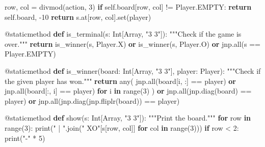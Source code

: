 \documentclass[
  letterpaper,
  DIV=11,
  numbers=noendperiod]{scrreprt}
\newenvironment{Shaded}{\begin{snugshade}}{\end{snugshade}}
\newcommand{\AttributeTok}[1]{\textcolor[rgb]{0.40,0.45,0.13}{#1}}
\newcommand{\BuiltInTok}[1]{\textcolor[rgb]{0.00,0.23,0.31}{#1}}
\newcommand{\CommentTok}[1]{\textcolor[rgb]{0.37,0.37,0.37}{#1}}
\newcommand{\ControlFlowTok}[1]{\textcolor[rgb]{0.00,0.23,0.31}{\textbf{#1}}}
\newcommand{\DecValTok}[1]{\textcolor[rgb]{0.68,0.00,0.00}{#1}}
\newcommand{\KeywordTok}[1]{\textcolor[rgb]{0.00,0.23,0.31}{\textbf{#1}}}
\newcommand{\NormalTok}[1]{\textcolor[rgb]{0.00,0.23,0.31}{#1}}
\newcommand{\OperatorTok}[1]{\textcolor[rgb]{0.37,0.37,0.37}{#1}}
\newcommand{\StringTok}[1]{\textcolor[rgb]{0.13,0.47,0.30}{#1}}
\newcommand{\VariableTok}[1]{\textcolor[rgb]{0.07,0.07,0.07}{#1}}
\theoremstyle{plain}
\theoremstyle{plain}
\theoremstyle{definition}
\theoremstyle{definition}
\theoremstyle{remark}
\begin{document}
\begin{Shaded}
\begin{Highlighting}[]
\NormalTok{            row, col }\OperatorTok{=} \BuiltInTok{divmod}\NormalTok{(action, }\DecValTok{3}\NormalTok{)}
            \ControlFlowTok{if} \VariableTok{self}\NormalTok{.board[row, col] }\OperatorTok{!=}\NormalTok{ Player.EMPTY:}
                \ControlFlowTok{return} \VariableTok{self}\NormalTok{.board, }\OperatorTok{{-}}\DecValTok{10}
            \ControlFlowTok{return}\NormalTok{ s.at[row, col].}\BuiltInTok{set}\NormalTok{(player)}

        \AttributeTok{@staticmethod}
        \KeywordTok{def}\NormalTok{ is\_terminal(s: Int[Array, }\StringTok{"3 3"}\NormalTok{]):}
            \CommentTok{"""Check if the game is over."""}
            \ControlFlowTok{return}\NormalTok{ is\_winner(s, Player.X) }\KeywordTok{or}\NormalTok{ is\_winner(s, Player.O) }\KeywordTok{or}\NormalTok{ jnp.}\BuiltInTok{all}\NormalTok{(s }\OperatorTok{==}\NormalTok{ Player.EMPTY)}

        \AttributeTok{@staticmethod}
        \KeywordTok{def}\NormalTok{ is\_winner(board: Int[Array, }\StringTok{"3 3"}\NormalTok{], player: Player):}
            \CommentTok{"""Check if the given player has won."""}
            \ControlFlowTok{return} \BuiltInTok{any}\NormalTok{(}
\NormalTok{                jnp.}\BuiltInTok{all}\NormalTok{(board[i, :] }\OperatorTok{==}\NormalTok{ player) }\KeywordTok{or}
\NormalTok{                jnp.}\BuiltInTok{all}\NormalTok{(board[:, i] }\OperatorTok{==}\NormalTok{ player)}
                \ControlFlowTok{for}\NormalTok{ i }\KeywordTok{in} \BuiltInTok{range}\NormalTok{(}\DecValTok{3}\NormalTok{)}
\NormalTok{            ) }\KeywordTok{or}\NormalTok{ jnp.}\BuiltInTok{all}\NormalTok{(jnp.diag(board) }\OperatorTok{==}\NormalTok{ player) }\KeywordTok{or}\NormalTok{ jnp.}\BuiltInTok{all}\NormalTok{(jnp.diag(jnp.fliplr(board)) }\OperatorTok{==}\NormalTok{ player)}

        \AttributeTok{@staticmethod}
        \KeywordTok{def}\NormalTok{ show(s: Int[Array, }\StringTok{"3 3"}\NormalTok{]):}
            \CommentTok{"""Print the board."""}
            \ControlFlowTok{for}\NormalTok{ row }\KeywordTok{in} \BuiltInTok{range}\NormalTok{(}\DecValTok{3}\NormalTok{):}
                \BuiltInTok{print}\NormalTok{(}\StringTok{" | "}\NormalTok{.join(}\StringTok{" XO"}\NormalTok{[s[row, col]] }\ControlFlowTok{for}\NormalTok{ col }\KeywordTok{in} \BuiltInTok{range}\NormalTok{(}\DecValTok{3}\NormalTok{)))}
                \ControlFlowTok{if}\NormalTok{ row }\OperatorTok{\textless{}} \DecValTok{2}\NormalTok{:}
                    \BuiltInTok{print}\NormalTok{(}\StringTok{"{-}"} \OperatorTok{*} \DecValTok{5}\NormalTok{)}
\end{Highlighting}
\end{Shaded}
\end{document}
